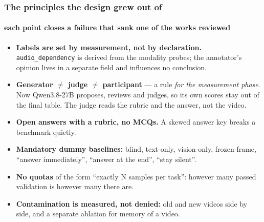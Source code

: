 \documentclass[aspectratio=169,10pt]{beamer}
\newcommand{\lead}[1]{{\color{warm}\textbf{#1}}}
\begin{document}
\begin{frame}
  \frametitle{The principles the design grew out of}
  \framesubtitle{each point closes a failure that sank one of the works reviewed}

  \begin{itemize}
    \item \lead{Labels are set by measurement, not by declaration.} \texttt{audio\_dependency}
          is derived from the modality probes; the annotator's opinion lives in a separate
          field and influences no conclusion.
    \item \lead{Generator $\neq$ judge $\neq$ participant} — a rule \emph{for the measurement phase}.
          Now Qwen3.8-27B proposes, reviews and judges, so its own scores stay out of the final table.
          The judge reads the rubric and the answer, not the video.
    \item \lead{Open answers with a rubric, no MCQs.} A skewed answer key breaks a benchmark quietly.
    \item \lead{Mandatory dummy baselines:} blind, text-only, vision-only, frozen-frame,
          ``answer immediately'', ``answer at the end'', ``stay silent''.
    \item \lead{No quotas} of the form ``exactly N samples per task'': however many passed validation is however many there are.
    \item \lead{Contamination is measured, not denied:} old and new videos side by side, and a separate ablation for memory of a video.
  \end{itemize}
\end{frame}
\end{document}
